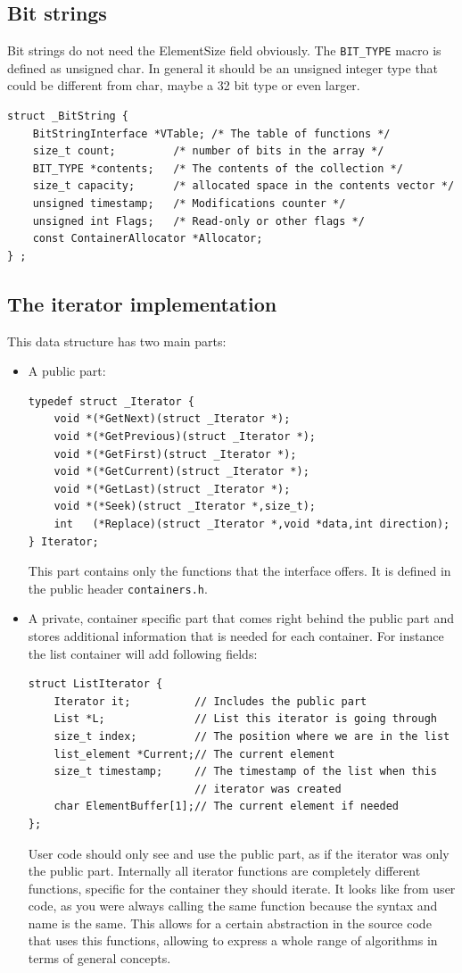 \documentclass[12pt,a4paper]{memoir} %
\begin{document}
{{\subsection{Bit strings}
Bit strings do not need the ElementSize field obviously. The \verb,BIT_TYPE, macro is defined as unsigned char. In general it should be an
unsigned integer type that could be different from char, maybe a 32 bit type or even larger.
\begin{verbatim}
struct _BitString {
    BitStringInterface *VTable; /* The table of functions */
    size_t count;         /* number of bits in the array */
    BIT_TYPE *contents;   /* The contents of the collection */
    size_t capacity;      /* allocated space in the contents vector */
    unsigned timestamp;   /* Modifications counter */
    unsigned int Flags;   /* Read-only or other flags */
    const ContainerAllocator *Allocator;
} ;
\end{verbatim}

\subsection{The iterator implementation}
This data structure has two main parts:
\begin{itemize}
\item A public part:
\begin{verbatim}
typedef struct _Iterator {
    void *(*GetNext)(struct _Iterator *);
    void *(*GetPrevious)(struct _Iterator *);
    void *(*GetFirst)(struct _Iterator *);
    void *(*GetCurrent)(struct _Iterator *);
    void *(*GetLast)(struct _Iterator *);
    void *(*Seek)(struct _Iterator *,size_t);
    int   (*Replace)(struct _Iterator *,void *data,int direction);
} Iterator;
\end{verbatim} 
This part contains only the functions that the interface offers. It is defined in the public header \verb,containers.h,.
\item A private, container specific part that comes right behind the public part and stores additional information that is needed for each container. 
For instance the list container will add following fields:
\begin{verbatim}
struct ListIterator {
    Iterator it;          // Includes the public part
    List *L;              // List this iterator is going through
    size_t index;         // The position where we are in the list
    list_element *Current;// The current element
    size_t timestamp;     // The timestamp of the list when this
                          // iterator was created
    char ElementBuffer[1];// The current element if needed
};
\end{verbatim}
User code should only see and use the public part, as if the iterator was only the public part. Internally all iterator functions are completely 
different functions, specific for the container they should iterate. It looks like from user code, as you were always calling the same function because 
the syntax and name is the same. This allows for a certain abstraction in the source code that uses this functions, allowing to express a whole range 
of algorithms in terms of general concepts.


\end{itemize}}}
\end{document}
